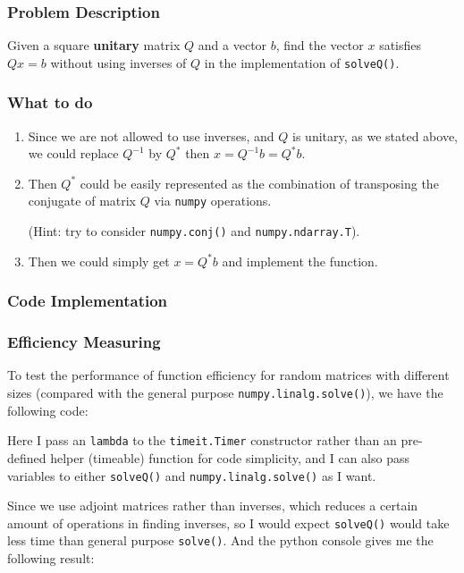 \subsubsection*{Problem Description}%
Given a square \textbf{unitary} matrix $Q$ and a vector $b$, find the vector $x$ satisfies $Qx = b$ without using inverses of $Q$ in the implementation of \texttt{solveQ()}.

\subsubsection*{What to do}%
\begin{enumerate}
\item Since we are not allowed to use inverses, and $Q$ is unitary, as we stated above, we could replace $Q^{-1}$ by $Q^{*}$ then $x = Q^{-1}b = Q^{*}b$.
\item Then $Q^{*}$ could be easily represented as the combination of transposing the conjugate of matrix $Q$ via \texttt{numpy} operations.

(Hint: try to consider \texttt{numpy.conj()} and \texttt{numpy.ndarray.T}).
\item Then we could simply get $x = Q^{*}b$ and implement the function.
\end{enumerate}

\subsubsection*{Code Implementation}


\subsubsection*{Efficiency Measuring}%
To test the performance of function efficiency for random matrices with different sizes (compared with the general purpose \texttt{numpy.linalg.solve()}), we have the following code:

Here I pass an \texttt{lambda} to the \texttt{timeit.Timer} constructor rather than an pre-defined helper (timeable) function for code simplicity, and I can also pass variables to either \texttt{solveQ()} and \texttt{numpy.linalg.solve()} as I want.

\medskip
\noindent Since we use adjoint matrices rather than inverses, which reduces a certain amount of operations in finding inverses, so I would expect \texttt{solveQ()} would take less time than general purpose \texttt{solve()}. And the python console gives me the following result:


